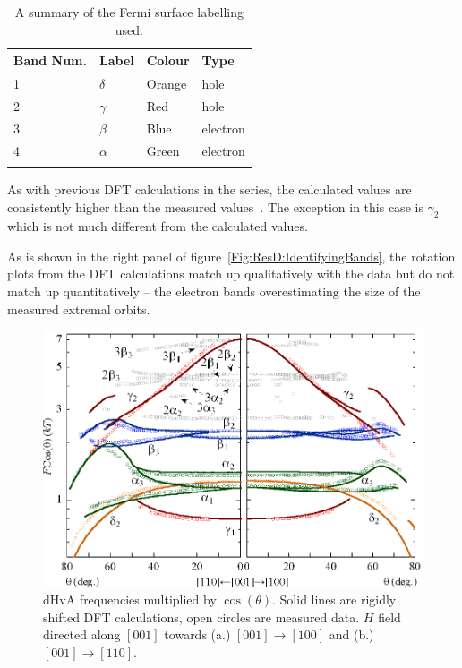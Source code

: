\begin{table}
    \begin{center}
        \caption{A summary of the Fermi surface labelling used.}
        \begin{tabular}[htbp]{llll}
\toprule
Band Num.  & Label & Colour    & Type \\
\midrule
1   & $\delta$  & Orange    & hole \\
2   & $\gamma$  & Red   & hole \\
3   & $\beta$   & Blue  & electron \\
4   & $\alpha$  & Green & electron \\
\bottomrule
        \label{Tab:ResD:BandNaming}
        \end{tabular}
    \end{center}
\end{table}

As with previous \ac{DFT} calculations in the \BaFePAs series, the calculated values are consistently higher than the measured values~\cite{Shishido2010}. The exception in this case is $\gamma_2$ which is not much different from the calculated values.

As is shown in the right panel of figure~\ref{Fig:ResD:IdentifyingBands}, the rotation plots from the \ac{DFT} calculations match up qualitatively with the data but do not match up quantitatively -- the electron bands overestimating the size of the measured extremal orbits. 

\begin{figure}[htbp]
    \begin{center}
        \includegraphics[scale=0.9]{Chapter-dHvABaFe2P2/Figures/AngleDepMeasurements/AngleSweepRigidShift/AngleSweepRigidShift}
        \caption{\ac{dHvA} frequencies multiplied by $\cos(\theta)$. Solid lines are rigidly shifted \ac{DFT} calculations, open circles are measured data. $H$ field directed along $[001]$ towards (a.) $[001]\rightarrow[100]$ and (b.) $[001]\rightarrow[110]$.}
        \label{Fig:ResD:AngleSweepRigidShift}
    \end{center}
\end{figure}

